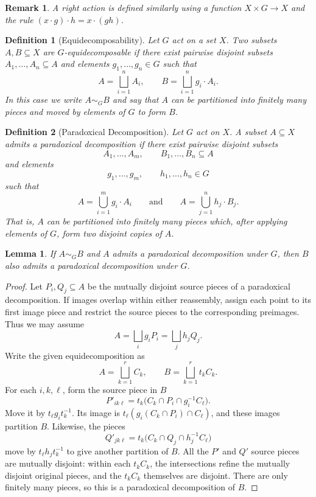 \documentclass[12pt,a4paper]{article}
\theoremstyle{spaced}
\newtheorem{definition}{Definition}[section]
\newtheorem{lemma}{Lemma}[section]
\newtheorem{remark}{Remark}[section]
\begin{document}
\begin{remark}
	A \emph{right} action is defined similarly using a function
	$X \times G \to X$ and the rule
	\((x \cdot g)\cdot h = x \cdot (gh)\).
\end{remark}

\begin{definition}[Equidecomposability]
	Let $G$ act on a set $X$.
	Two subsets $A,B \subseteq X$ are \emph{$G$-equidecomposable} if there exist
	pairwise disjoint subsets $A_1,\dots,A_n \subseteq A$ and elements
	$g_1,\dots,g_n \in G$ such that
	\[
		A = \bigsqcup_{i=1}^n A_i,
		\qquad B = \bigsqcup_{i=1}^n g_i \cdot A_i.
	\]
	In this case we write $A \sim_G B$ and say that $A$ can be partitioned into finitely
	many pieces and moved by elements of $G$ to form $B$.
\end{definition}

\begin{definition}[Paradoxical Decomposition]
	Let $G$ act on $X$.
	A subset $A \subseteq X$ admits a \emph{paradoxical decomposition} if there exist
	pairwise disjoint subsets
	\[
		A_1,\dots,A_m, \qquad B_1,\dots,B_n \subseteq A
	\]
	and elements
	\[
		g_1,\dots,g_m, \qquad h_1,\dots,h_n \in G
	\]
	such that
	\[
		A = \bigcup_{i=1}^m g_i \cdot A_i
		\qquad\text{and}\qquad
		A = \bigcup_{j=1}^n h_j \cdot B_j.
	\]
	That is, $A$ can be partitioned into finitely many pieces which, after applying
	elements of $G$, form two disjoint copies of $A$.
\end{definition}

\begin{lemma}\label{lem:equidecomp_preserves_paradoxical}
	If $A \sim_G B$ and $A$ admits a paradoxical decomposition under $G$, then
	$B$ also admits a paradoxical decomposition under $G$.
\end{lemma}

\begin{proof}
	Let $P_i,Q_j\subseteq A$ be the mutually disjoint source pieces of a
	paradoxical decomposition. If images overlap within either reassembly,
	assign each point to its first image piece and restrict the source pieces
	to the corresponding preimages. Thus we may assume
	\[
		A=\bigsqcup_i g_iP_i=\bigsqcup_j h_jQ_j.
	\]
	Write the given equidecomposition as
	\[
		A=\bigsqcup_{k=1}^r C_k,
		\qquad B=\bigsqcup_{k=1}^r t_kC_k.
	\]
	For each $i,k,\ell$, form the source piece in $B$
	\[
		P'_{ik\ell}=t_k\bigl(C_k\cap P_i\cap g_i^{-1}C_\ell\bigr).
	\]
	Move it by $t_\ell g_i t_k^{-1}$. Its image is
	$t_\ell(g_i(C_k\cap P_i)\cap C_\ell)$, and these images partition $B$.
	Likewise, the pieces
	\[
		Q'_{jk\ell}=t_k\bigl(C_k\cap Q_j\cap h_j^{-1}C_\ell\bigr)
	\]
	move by $t_\ell h_jt_k^{-1}$ to give another partition of $B$.
	All the $P'$ and $Q'$ source pieces are mutually disjoint: within each
	$t_kC_k$, the intersections refine the mutually disjoint original pieces,
	and the $t_kC_k$ themselves are disjoint. There are only finitely many
	pieces, so this is a paradoxical decomposition of $B$.
\end{proof}
\end{document}
